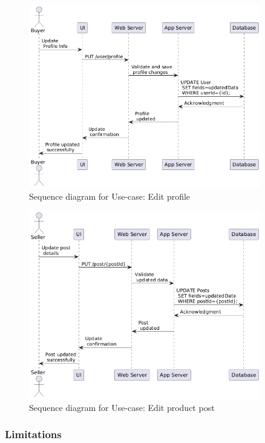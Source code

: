 \begin{figure}[!h]
	\centering
	\includegraphics[width=0.9\textwidth]{chapters/ch-04/304_usecase_edit_profile.png} %
	\caption{Sequence diagram for Use-case: Edit profile}
	\label{fig:seq_05} %
\end{figure}

\begin{figure}[!h]
	\centering
	\includegraphics[width=0.9\textwidth]{chapters/ch-04/305_usecase_edit_post.png} %
	\caption{Sequence diagram for Use-case: Edit product post}
	\label{fig:seq_06} %
\end{figure}

\subsubsection{Limitations}

